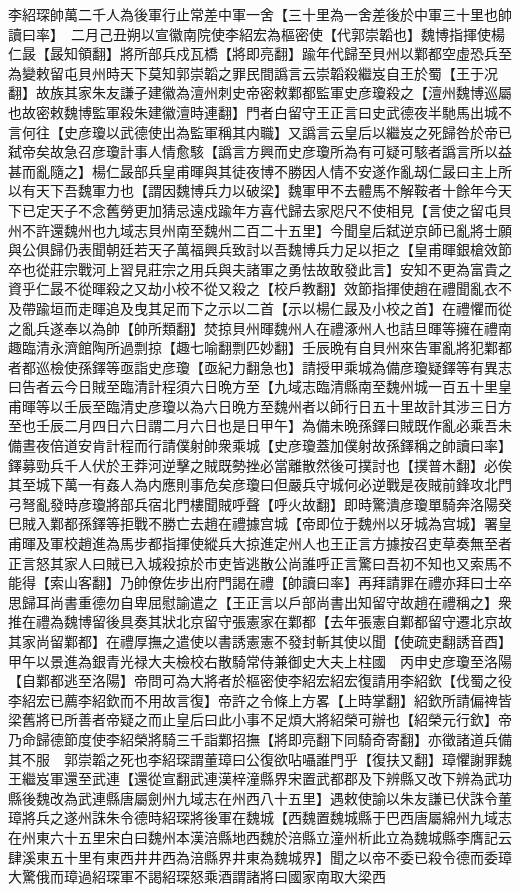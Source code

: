 李紹琛帥萬二千人為後軍行止常差中軍一舍【三十里為一舍差後於中軍三十里也帥讀曰率】　二月己丑朔以宣徽南院使李紹宏為樞密使【代郭崇韜也】魏博指揮使楊仁晸【晸知領翻】將所部兵戍瓦橋【將即亮翻】踰年代歸至貝州以鄴都空虛恐兵至為變敕留屯貝州時天下莫知郭崇韜之罪民間譌言云崇韜殺繼岌自王於蜀【王于况翻】故族其家朱友謙子建徽為澶州刺史帝密敕鄴都監軍史彦瓊殺之【澶州魏博巡屬也故密敕魏博監軍殺朱建徽澶時連翻】門者白留守王正言曰史武德夜半馳馬出城不言何往【史彦瓊以武德使出為監軍稱其内職】又譌言云皇后以繼岌之死歸咎於帝已弑帝矣故急召彦瓊計事人情愈駭【譌言方興而史彦瓊所為有可疑可駭者譌言所以益甚而亂隨之】楊仁晸部兵皇甫暉與其徒夜博不勝因人情不安遂作亂刼仁晸曰主上所以有天下吾魏軍力也【謂因魏博兵力以破梁】魏軍甲不去體馬不解鞍者十餘年今天下已定天子不念舊勞更加猜忌遠戍踰年方喜代歸去家咫尺不使相見【言使之留屯貝州不許還魏州也九域志貝州南至魏州二百二十五里】今聞皇后弑逆京師已亂將士願與公俱歸仍表聞朝廷若天子萬福興兵致討以吾魏博兵力足以拒之【皇甫暉銀槍效節卒也從莊宗戰河上習見莊宗之用兵與夫諸軍之勇怯故敢發此言】安知不更為富貴之資乎仁晸不從暉殺之又劫小校不從又殺之【校戶教翻】效節指揮使趙在禮聞亂衣不及帶踰垣而走暉追及曳其足而下之示以二首【示以楊仁晸及小校之首】在禮懼而從之亂兵遂奉以為帥【帥所類翻】焚掠貝州暉魏州人在禮涿州人也詰旦暉等擁在禮南趣臨清永濟館陶所過剽掠【趣七喻翻剽匹妙翻】壬辰晩有自貝州來告軍亂將犯鄴都者都巡檢使孫鐸等亟詣史彦瓊【亟紀力翻急也】請授甲乘城為備彦瓊疑鐸等有異志曰告者云今日賊至臨清計程須六日晩方至【九域志臨清縣南至魏州城一百五十里皇甫暉等以壬辰至臨清史彦瓊以為六日晩方至魏州者以師行日五十里故計其涉三日方至也壬辰二月四日六日謂二月六日也是日甲午】為備未晩孫鐸曰賊既作亂必乘吾未備晝夜倍道安肯計程而行請僕射帥衆乘城【史彦瓊蓋加僕射故孫鐸稱之帥讀曰率】鐸募勁兵千人伏於王莽河逆擊之賊既勢挫必當離散然後可撲討也【撲普木翻】必俟其至城下萬一有姦人為内應則事危矣彦瓊曰但嚴兵守城何必逆戰是夜賊前鋒攻北門弓弩亂發時彦瓊將部兵宿北門樓聞賊呼聲【呼火故翻】即時驚潰彦瓊單騎奔洛陽癸巳賊入鄴都孫鐸等拒戰不勝亡去趙在禮據宫城【帝即位于魏州以牙城為宫城】署皇甫暉及軍校趙進為馬步都指揮使縱兵大掠進定州人也王正言方據按召吏草奏無至者正言怒其家人曰賊已入城殺掠於市吏皆逃散公尚誰呼正言驚曰吾初不知也又索馬不能得【索山客翻】乃帥僚佐步出府門謁在禮【帥讀曰率】再拜請罪在禮亦拜曰士卒思歸耳尚書重德勿自卑屈慰諭遣之【王正言以戶部尚書出知留守故趙在禮稱之】衆推在禮為魏博留後具奏其狀北京留守張憲家在鄴都【去年張憲自鄴都留守遷北京故其家尚留鄴都】在禮厚撫之遣使以書誘憲憲不發封斬其使以聞【使疏吏翻誘音酉】　甲午以景進為銀青光禄大夫檢校右散騎常侍兼御史大夫上柱國　丙申史彦瓊至洛陽【自鄴都逃至洛陽】帝問可為大將者於樞密使李紹宏紹宏復請用李紹欽【伐蜀之役李紹宏已薦李紹欽而不用故言復】帝許之令條上方畧【上時掌翻】紹欽所請偏禆皆梁舊將已所善者帝疑之而止皇后曰此小事不足煩大將紹榮可辦也【紹榮元行欽】帝乃命歸德節度使李紹榮將騎三千詣鄴招撫【將即亮翻下同騎奇寄翻】亦徵諸道兵備其不服　郭崇韜之死也李紹琛謂董璋曰公復欲呫囁誰門乎【復扶又翻】璋懼謝罪魏王繼岌軍還至武連【還從宣翻武連漢梓潼縣界宋置武都郡及下辨縣又改下辨為武功縣後魏改為武連縣唐屬劍州九域志在州西八十五里】遇敕使諭以朱友謙已伏誅令董璋將兵之遂州誅朱令德時紹琛將後軍在魏城【西魏置魏城縣于巴西唐屬綿州九域志在州東六十五里宋白曰魏州本漢涪縣地西魏於涪縣立潼州析此立為魏城縣李膺記云肆溪東五十里有東西井井西為涪縣界井東為魏城界】聞之以帝不委已殺令德而委璋大驚俄而璋過紹琛軍不謁紹琛怒乘酒謂諸將曰國家南取大梁西